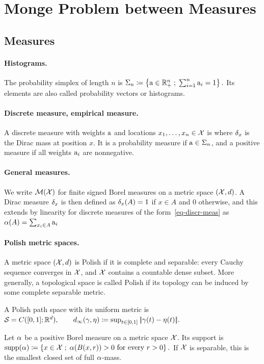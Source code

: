 \section{Monge Problem between Measures}
\label{sec-monge}
\subsection{Measures}
\label{sec-measures}
\paragraph{Histograms.}
\begin{defn}\label{def-probability-simplex}
The probability simplex of length $n$ is \(\Sigma_n \coloneqq \left\{ \mathrm{a} \in \mathbb{R}_+^n \;;\;  \sum_{i=1}^n \mathrm{a}_i = 1  \right\}.\)
Its elements are also called probability vectors or histograms.
\end{defn}
\paragraph{Discrete measure, empirical measure.}
\begin{defn}\label{def-discrete-measure}
A discrete measure with weights $\mathrm{a}$ and locations $x_1,\dots,x_n\in\mathcal{X}$ is
where $\delta_x$ is the Dirac mass at position $x$. It is a probability measure if $\mathrm{a}\in\Sigma_n$, and a positive measure if all weights $\mathrm{a}_i$ are nonnegative.
\end{defn}
\paragraph{General measures.} We write $\mathcal{M}(\mathcal{X})$ for finite signed Borel measures on a metric space $(\mathcal{X},d)$.
A Dirac measure $\delta_x$ is then defined as $\delta_x(A)=1$ if $x \in A$ and $0$ otherwise, and this extends by linearity for discrete measures of the form~\eqref{eq-discr-meas} as \(\alpha(A) = \sum_{x_i \in A} \mathrm{a}_i\)
\paragraph{Polish metric spaces.}
\begin{defn}\label{def-polish-metric-space}
A metric space $(\mathcal{X},d)$ is Polish if it is complete and separable: every Cauchy sequence converges in $\mathcal{X}$, and $\mathcal{X}$ contains a countable dense subset. More generally, a topological space is called Polish if its topology can be induced by some complete separable metric.
\end{defn}
A Polish path space with its uniform metric is \(\mathcal{S}=C([0,1];\mathbb{R}^d),\qquad d_\infty(\gamma,\eta) \coloneqq \sup_{t\in[0,1]}|\!| \gamma(t)-\eta(t) |\!|.\)
\begin{defn}\label{def:support}
Let $\alpha$ be a positive Borel measure on a metric space $\mathcal{X}$. Its support is \(\operatorname{supp}(\alpha) \coloneqq \left\{ x\in\mathcal{X} \;;\; \alpha(B(x,r))>0\text{ for every }r>0 \right\}.\)
If $\mathcal{X}$ is separable, this is the smallest closed set of full $\alpha$-mass.
\end{defn}
